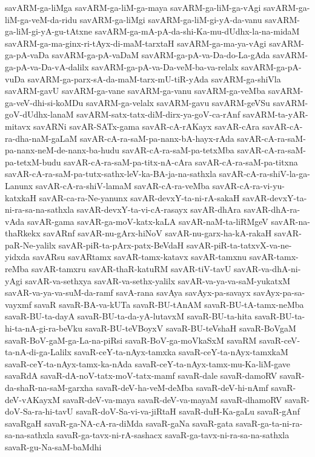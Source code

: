 {savARM-ga-liMga
savARM-ga-liM-ga-maya
savARM-ga-liM-ga-vAgi
savARM-ga-liM-ga-veM-da-ridu
savARM-ga-liMgi
savARM-ga-liM-gi-yA-da-vanu
savARM-ga-liM-gi-yA-gu-tAtxne
savARM-ga-mA-pA-da-shi-Ka-mu-dUdhx-la-na-midaM
savARM-ga-ma-ginx-ri-tAyx-di-maM-tarxtaH
savARM-ga-ma-ya-vAgi
savARM-ga-pA-vaDa
savARM-ga-pA-vaDaM
savARM-ga-pA-va-Da-do-La-gAda
savARM-ga-pA-va-Da-vA-dalilx
savARM-ga-pA-va-Da-veM-ba-va-relalx
savARM-ga-pA-vuDa
savARM-ga-parx-sA-da-maM-tarx-mU-tiR-yAda
savARM-ga-shiVla
savARM-gavU
savARM-ga-vane
savARM-ga-vanu
savARM-ga-veMba
savARM-ga-veV-dhi-si-koMDu
savARM-ga-velalx
savARM-gavu
savARM-geVSu
savARM-goV-dUdhx-lanaM
savARM-satx-tatx-diM-dirx-ya-goV-ca-rAnf
savARM-ta-yAR-mitavx
savARNi
savAR-SATx-gama
savAR-cA-rAKayx
savAR-cAra
savAR-cA-ra-dha-naM-gaLaM
savAR-cA-ra-saM-pa-nanx-bA-hayx-rAda
savAR-cA-ra-saM-pa-nanx-neM-de-nanx-ba-hudu
savAR-cA-ra-saM-pa-tetxMba
savAR-cA-ra-saM-pa-tetxM-budu
savAR-cA-ra-saM-pa-titx-nA-cAra
savAR-cA-ra-saM-pa-titxna
savAR-cA-ra-saM-pa-tutx-sathx-leV-ka-BA-ja-na-sathxla
savAR-cA-ra-shiV-la-ga-Lanunx
savAR-cA-ra-shiV-lamaM
savAR-cA-ra-veMba
savAR-cA-ra-vi-yu-katxkaH
savAR-ca-ra-Ne-yanunx
savAR-devxY-ta-ni-rA-sakaH
savAR-devxY-ta-ni-ra-sa-na-sathxla
savAR-devxY-ta-vi-cA-rasayx
savAR-dhAra
savAR-dhA-ra-vAda
savAR-gama
savAR-ga-moV-katx-kaLA
savAR-naM-ta-liRMgeV
savAR-na-thaRkekx
savARnf
savAR-nu-gArx-hiNoV
savAR-nu-garx-ha-kA-rakaH
savAR-paR-Ne-yalilx
savAR-piR-ta-pArx-patx-BeVdaH
savAR-piR-ta-tatxvX-va-ne-yidxda
savARsu
savARtamx
savAR-tamx-katavx
savAR-tamxnu
savAR-tamx-reMba
savAR-tamxru
savAR-thaR-katuRM
savAR-tiV-tavU
savAR-va-dhA-ni-yAgi
savAR-va-sethxya
savAR-va-sethx-yalilx
savAR-va-ya-va-saM-yukatxM
savAR-va-ya-va-suM-da-ramf
savA-rana
savAya
savAyx-pa-savayx
savAyx-pa-sa-vayxmf
savaR
savaR-BA-va-kUTa
savaR-BU-tAnAM
savaR-BU-tA-tamx-neMba
savaR-BU-ta-dayA
savaR-BU-ta-da-yA-lutavxM
savaR-BU-ta-hita
savaR-BU-ta-hi-ta-nA-gi-ra-beVku
savaR-BU-teVBoyxV
savaR-BU-teVshaH
savaR-BoVgaM
savaR-BoV-gaM-ga-La-na-piRsi
savaR-BoV-ga-moVkaSxM
savaRM
savaR-ceV-ta-nA-di-ga-Lalilx
savaR-ceY-ta-nAyx-tamxka
savaR-ceY-ta-nAyx-tamxkaM
savaR-ceY-ta-nAyx-tamx-ka-nAda
savaR-ceY-ta-nAyx-tamx-mu-Ka-liM-gave
savaRdA
savaR-dA-noV-tatx-moV-tatx-mamf
savaR-dale
savaR-damoRV
savaR-da-shaR-na-saM-garxha
savaR-deV-ha-veM-deMba
savaR-deV-hi-nAmf
savaR-deV-vAKayxM
savaR-deV-va-maya
savaR-deV-va-mayaM
savaR-dhamoRV
savaR-doV-Sa-ra-hi-tavU
savaR-doV-Sa-vi-va-jiRtaH
savaR-duH-Ka-gaLu
savaR-gAnf
savaRgaH
savaR-ga-NA-cA-ra-diMda
savaR-gaNa
savaR-gata
savaR-ga-ta-ni-ra-sa-na-sathxla
savaR-ga-tavx-ni-rA-sashacx
savaR-ga-tavx-ni-ra-sa-na-sathxla
savaR-gu-Na-saM-baMdhi
}
